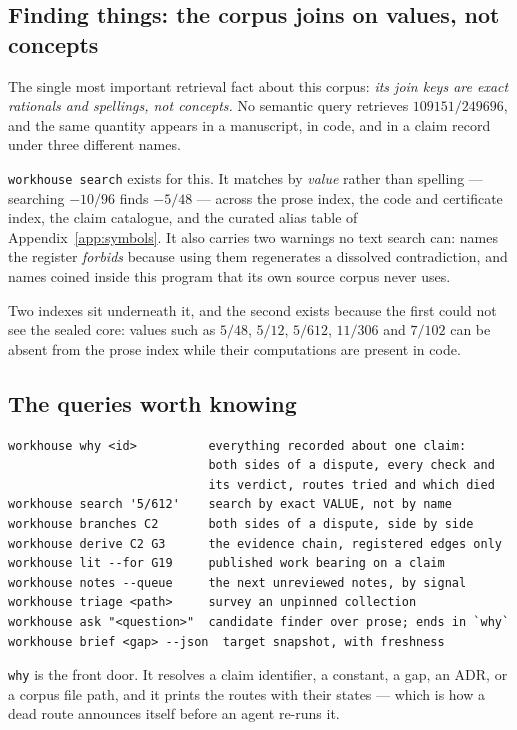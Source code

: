 \subsection{Finding things: the corpus joins on values, not concepts}

The single most important retrieval fact about this corpus:
\emph{its join keys are exact rationals and spellings, not concepts.}
No semantic query retrieves $109151/249696$, and the same quantity
appears in a manuscript, in code, and in a claim record under three
different names.

\texttt{workhouse search} exists for this. It matches by \emph{value}
rather than spelling --- searching $-10/96$ finds $-5/48$ --- across
the prose index, the code and certificate index, the claim catalogue,
and the curated alias table of Appendix~\ref{app:symbols}. It also
carries two warnings no text search can: names the register
\emph{forbids} because using them regenerates a dissolved
contradiction, and names coined inside this program that its own source
corpus never uses.

Two indexes sit underneath it, and the second exists because the first
could not see the sealed core: values such as $5/48$, $5/12$, $5/612$,
$11/306$ and $7/102$ can be absent from the prose index while their
computations are present in code.

\subsection{The queries worth knowing}

\begin{verbatim}
workhouse why <id>          everything recorded about one claim:
                            both sides of a dispute, every check and
                            its verdict, routes tried and which died
workhouse search '5/612'    search by exact VALUE, not by name
workhouse branches C2       both sides of a dispute, side by side
workhouse derive C2 G3      the evidence chain, registered edges only
workhouse lit --for G19     published work bearing on a claim
workhouse notes --queue     the next unreviewed notes, by signal
workhouse triage <path>     survey an unpinned collection
workhouse ask "<question>"  candidate finder over prose; ends in `why`
workhouse brief <gap> --json  target snapshot, with freshness
\end{verbatim}

\texttt{why} is the front door. It resolves a claim identifier, a
constant, a gap, an ADR, or a corpus file path, and it prints the
routes with their states --- which is how a dead route announces itself
before an agent re-runs it.

